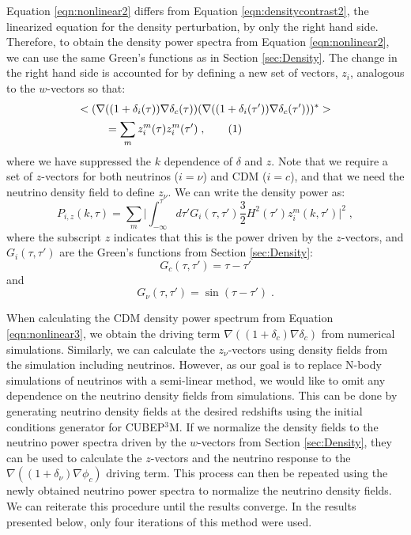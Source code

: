 \documentclass[twocolumn,superscriptaddress,prd]{revtex4}
\newcommand\numberthis{\addtocounter{equation}{1}\tag{\theequation}}
\begin{document}
Equation \eqref{eqn:nonlinear2} differs from Equation
\eqref{eqn:densitycontrast2}, the linearized equation for the density
perturbation, by only the right hand side. 
Therefore, to obtain the density power
spectra from Equation \eqref{eqn:nonlinear2}, we can use the same Green's functions as
in Section \ref{sec:Density}.  The change in the right hand side is
accounted for by defining a new set of vectors, $z_i$, analogous
to the $w$-vectors so that:
\begin{align*}
  <(\nabla& ((1 + \delta_i(\tau)) \nabla \delta_c(\tau)) (\nabla
  ((1+\delta_i(\tau')) \nabla \delta_c(\tau')))^*> \\
&= \sum_m
  z_i^m(\tau) z_i^m(\tau')\;, \numberthis
\end{align*}
where we have suppressed the $k$ dependence of $\delta$ and $z$.  
Note that we require a set of $z$-vectors for both neutrinos ($i=\nu$) and
CDM ($i=c$), and that we need the neutrino density
field to define $z_\nu$.
We can write the density power as:
\begin{equation}\label{eqn:nonlinear3}
  P_{i,z}(k,\tau) = \sum_m \bigg| \int_{-\infty}^\tau d\tau' G_i(\tau,\tau')
  \frac{3}{2} H^2(\tau') z_i^m(k, \tau') \bigg|^2\;,
\end{equation} 
where the subscript $z$ indicates that this is the power driven by the
$z$-vectors, and $G_i(\tau, \tau')$ are the Green's functions from Section
\ref{sec:Density}:
\begin{equation}
  G_c(\tau,\tau') = \tau-\tau'
\end{equation}
and
\begin{equation}
  G_\nu(\tau,\tau') = \sin( \tau-\tau')\;.
\end{equation}

When calculating the CDM density power spectrum from
Equation \eqref{eqn:nonlinear3}, we obtain the driving term
$\nabla((1+\delta_c)\nabla\delta_c)$ 
from numerical simulations.  
Similarly, we can calculate the $z_\nu$-vectors using density
fields from the simulation including neutrinos.
However, as our goal is to replace
N-body simulations of neutrinos with a semi-linear method, we would
like to omit any dependence on the neutrino density fields from
simulations.  This can be done by generating %
neutrino density fields
at the desired redshifts
using the initial conditions generator for CUBEP$^3$M. If we normalize
the density
fields
to the neutrino power spectra driven by the $w$-vectors 
from Section \ref{sec:Density}, 
they can be used to calculate the
$z$-vectors and the neutrino response to the $\nabla ((1+\delta_\nu)
\nabla \phi_c)$ driving term.  This
process can then be repeated using the newly obtained neutrino
power spectra to normalize the neutrino density fields.  We can
reiterate this procedure until the results converge.  In the results presented
below, only four iterations of this method were used.
\end{document}

